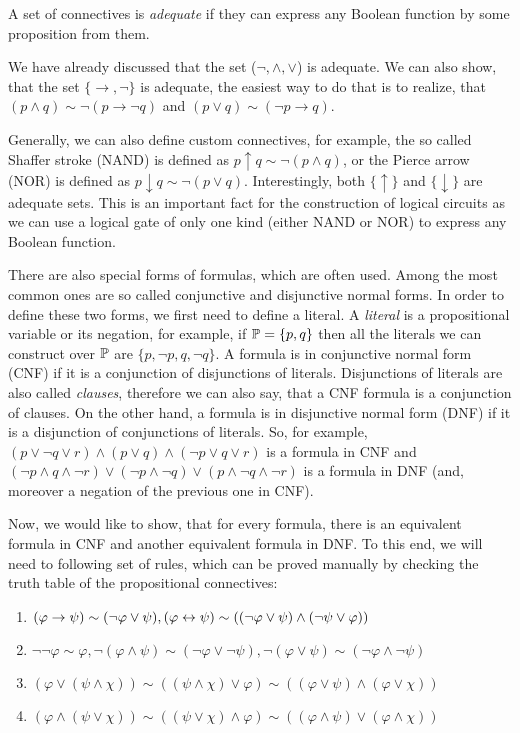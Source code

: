 \begin{definition}
A set of connectives is \emph{adequate} if they can express any Boolean function by some proposition from them.
\end{definition}

We have already discussed that the set ($\neg, \land, \lor$) is adequate. We can also show, that the set $\{\to, \neg\}$ is adequate, the easiest way to do that is to realize, that $(p \land q) \sim \neg (p \to \neg q)$ and $(p \lor q) \sim (\neg p \to q)$. 

Generally, we can also define custom connectives, for example, the so called Shaffer stroke (NAND) is defined as $p \uparrow q \sim \neg (p \land q)$, or the Pierce arrow (NOR) is defined as $p \downarrow q \sim \neg (p \lor q)$. Interestingly, both $\{\uparrow\}$ and $\{\downarrow\}$ are adequate sets. This is an important fact for the construction of logical circuits as we can use a logical gate of only one kind (either NAND or NOR) to express any Boolean function.

There are also special forms of formulas, which are often used. Among the most common ones are so called conjunctive and disjunctive normal forms. In order to define these two forms, we first need to define a literal. A \emph{literal} is a propositional variable or its negation, for example, if $\mathbb{P} = \{p, q\}$ then all the literals we can construct over $\mathbb{P}$ are $\{p, \neg p, q, \neg q\}$. A formula is in conjunctive normal form (CNF) if it is a conjunction of disjunctions of literals. Disjunctions of literals are also called \emph{clauses}, therefore we can also say, that a CNF formula is a conjunction of clauses. On the other hand, a formula is in disjunctive normal form (DNF) if it is a disjunction of conjunctions of literals. So, for example, $(p \lor \neg q \lor r) \land (p \lor q) \land (\neg p \lor q \lor r)$ is a formula in CNF and$(\neg p \land q \land \neg r) \lor (\neg p \land \neg q) \lor (p \land \neg q \land \neg r)$ is a formula in DNF (and, moreover a negation of the previous one in CNF). 

Now, we would like to show, that for every formula, there is an equivalent formula in CNF and another equivalent formula in DNF. To this end, we will need to following set of rules, which can be proved manually by checking the truth table of the propositional connectives: 

\begin{enumerate}
  \item $(\varphi \to \psi) \sim (\neg \varphi \lor \psi), (\varphi \leftrightarrow \psi) \sim ((\neg \varphi \lor \psi) \land (\neg \psi \lor \varphi))$
  \item $\neg \neg \varphi \sim \varphi, \neg (\varphi \land \psi) \sim (\neg \varphi \lor \neg \psi), \neg (\varphi \lor \psi) \sim (\neg \varphi \land \neg \psi)$
  \item $(\varphi \lor (\psi \land \chi)) \sim ((\psi \land \chi)  \lor \varphi) \sim ((\varphi \lor \psi) \land (\varphi \lor \chi))$
  \item $(\varphi \land (\psi \lor \chi)) \sim ((\psi \lor \chi)  \land \varphi) \sim ((\varphi \land \psi) \lor (\varphi \land \chi))$
\end{enumerate}

